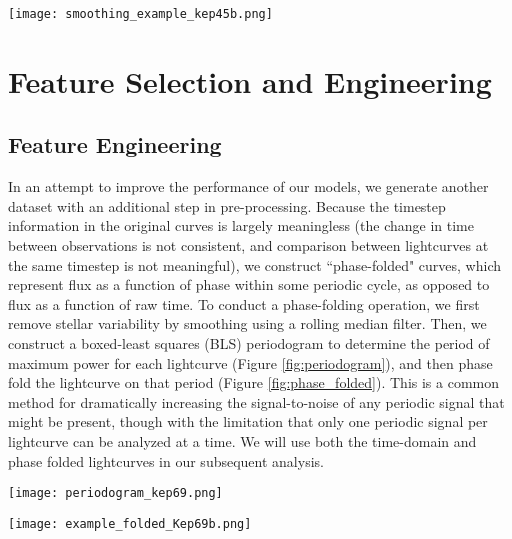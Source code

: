 \documentclass{article}
\begin{document}
\begin{figure*}[ht]
\centering
\texttt{[image: smoothing\_example\_kep45b.png]}
\caption{An example of smoothing a stellar lightcurve to remove stellar variability using a median filter (Kepler-45).}
\label{fig:smoothing}
\end{figure*}

\section{Feature Selection and Engineering}

\subsection{Feature Engineering}
\label{subsec:feature_engineering}

In an attempt to improve the performance of our models, we generate another dataset with an additional step in pre-processing. Because the timestep information in the original curves is largely meaningless (the change in time between observations is not consistent, and comparison between lightcurves at the same timestep is not meaningful), we construct ``phase-folded" curves, which represent flux as a function of phase within some periodic cycle, as opposed to flux as a function of raw time. To conduct a phase-folding operation, we first remove stellar variability by smoothing using a rolling median filter. Then, we construct a boxed-least squares (BLS) periodogram to determine the period of maximum power for each lightcurve (Figure \ref{fig:periodogram}), and then phase fold the lightcurve on that period (Figure \ref{fig:phase_folded}). This is a common method for dramatically increasing the signal-to-noise of any periodic signal that might be present, though with the limitation that only one periodic signal per lightcurve can be analyzed at a time. We will use both the time-domain and phase folded lightcurves in our subsequent analysis. 

\begin{figure*}[ht]
\centering
\texttt{[image: periodogram\_kep69.png]}
\caption{An example of BLS periodogram. The frequency of highest power is used to construct the phase-folded lightcurve.}
\label{fig:periodogram}
\end{figure*}

\begin{figure*}[ht]
\centering
\texttt{[image: example\_folded\_Kep69b.png]}
\caption{An example of a phase-folded lightcurve. Blue points represent folded flux values, and the orange curve represents the binned folded lightcurve. Features should be more meaningful after phase folding because a dip of a few percent at a phase of zero should appear in all positive observation, though some types of stellar variability could also produce this pattern.}
\label{fig:phase_folded}
\end{figure*}
\end{document}
